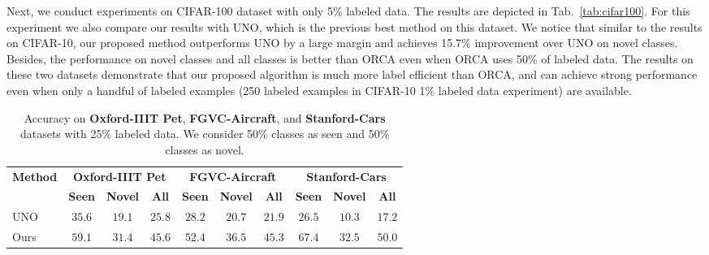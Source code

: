\documentclass[runningheads]{eccv2022submission}
\begin{document}
Next, we conduct experiments on CIFAR-100 dataset with only 5\% labeled data. The results are depicted in Tab.~\ref{tab:cifar100}. For this experiment we also compare our results with UNO\cite{fini2021unified}, which is the previous best method on this dataset. We notice that similar to the results on CIFAR-10, our proposed method outperforms UNO by a large margin and achieves 15.7\% improvement over UNO on novel classes. Besides, the performance on novel classes and all classes is better than ORCA even when ORCA uses 50\% of labeled data. The results on these two datasets demonstrate that our proposed algorithm is much more label efficient than ORCA, and can achieve strong performance even when only a handful of labeled examples (250 labeled examples in CIFAR-10 1\% labeled data experiment) are available.  




\begin{table*}[h]
\caption{Accuracy on \textbf{Oxford-IIIT Pet}, \textbf{FGVC-Aircraft}, and \textbf{Stanford-Cars}  datasets with 25\% labeled data. We consider 50\% classes as seen and 50\% classes as novel.}
\label{tab:finegrained}
\begin{center}\setlength{\tabcolsep}{4pt}
\small
\begin{tabular}{lccc|ccc|ccc}
\hline



\multicolumn{1}{c}{\multirow{2}{*}{\textbf{Method}}} & \multicolumn{3}{c|}{\textbf{Oxford-IIIT Pet}} & \multicolumn{3}{c|}{\textbf{FGVC-Aircraft}} &\multicolumn{3}{c}{\textbf{Stanford-Cars}} \\  
\multicolumn{1}{c}{} & \textbf{Seen} & \textbf{Novel} & \textbf{All}  & \textbf{Seen} & \textbf{Novel} & \textbf{All}  & \textbf{Seen} & \textbf{Novel} & \textbf{All}\\




\hline

UNO\cite{fini2021unified} & $35.6$ & $19.1$ & $25.8$ & $28.2$ & $20.7$ & $21.9$ & $26.5$ & $10.3$ & $17.2$\\
Ours & {\cellcolor{yellow!15}}${59.1}$ & {\cellcolor{yellow!15}}${31.4}$ & {\cellcolor{yellow!15}}${45.6}$ & {\cellcolor{yellow!15}}$52.4$ & {\cellcolor{yellow!15}}${36.5}$ & {\cellcolor{yellow!15}}${45.3}$ & {\cellcolor{yellow!15}}${67.4}$ & {\cellcolor{yellow!15}}${32.5}$ & {\cellcolor{yellow!15}}${50.0}$\\\hline 



\end{tabular}
\end{center}


\end{table*}
\end{document}
